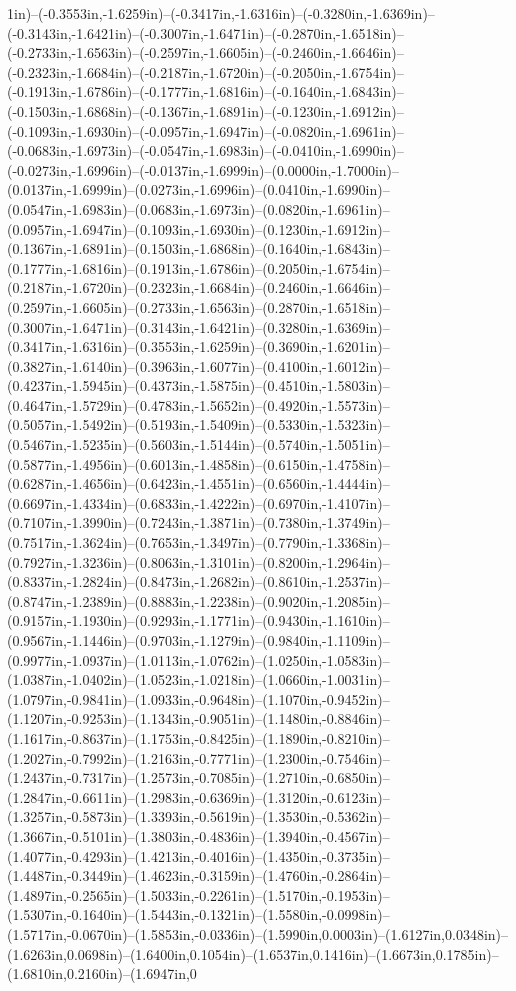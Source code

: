 1in)--(-0.3553in,-1.6259in)--(-0.3417in,-1.6316in)--(-0.3280in,-1.6369in)--(-0.3143in,-1.6421in)--(-0.3007in,-1.6471in)--(-0.2870in,-1.6518in)--(-0.2733in,-1.6563in)--(-0.2597in,-1.6605in)--(-0.2460in,-1.6646in)--(-0.2323in,-1.6684in)--(-0.2187in,-1.6720in)--(-0.2050in,-1.6754in)--(-0.1913in,-1.6786in)--(-0.1777in,-1.6816in)--(-0.1640in,-1.6843in)--(-0.1503in,-1.6868in)--(-0.1367in,-1.6891in)--(-0.1230in,-1.6912in)--(-0.1093in,-1.6930in)--(-0.0957in,-1.6947in)--(-0.0820in,-1.6961in)--(-0.0683in,-1.6973in)--(-0.0547in,-1.6983in)--(-0.0410in,-1.6990in)--(-0.0273in,-1.6996in)--(-0.0137in,-1.6999in)--(0.0000in,-1.7000in)--(0.0137in,-1.6999in)--(0.0273in,-1.6996in)--(0.0410in,-1.6990in)--(0.0547in,-1.6983in)--(0.0683in,-1.6973in)--(0.0820in,-1.6961in)--(0.0957in,-1.6947in)--(0.1093in,-1.6930in)--(0.1230in,-1.6912in)--(0.1367in,-1.6891in)--(0.1503in,-1.6868in)--(0.1640in,-1.6843in)--(0.1777in,-1.6816in)--(0.1913in,-1.6786in)--(0.2050in,-1.6754in)--(0.2187in,-1.6720in)--(0.2323in,-1.6684in)--(0.2460in,-1.6646in)--(0.2597in,-1.6605in)--(0.2733in,-1.6563in)--(0.2870in,-1.6518in)--(0.3007in,-1.6471in)--(0.3143in,-1.6421in)--(0.3280in,-1.6369in)--(0.3417in,-1.6316in)--(0.3553in,-1.6259in)--(0.3690in,-1.6201in)--(0.3827in,-1.6140in)--(0.3963in,-1.6077in)--(0.4100in,-1.6012in)--(0.4237in,-1.5945in)--(0.4373in,-1.5875in)--(0.4510in,-1.5803in)--(0.4647in,-1.5729in)--(0.4783in,-1.5652in)--(0.4920in,-1.5573in)--(0.5057in,-1.5492in)--(0.5193in,-1.5409in)--(0.5330in,-1.5323in)--(0.5467in,-1.5235in)--(0.5603in,-1.5144in)--(0.5740in,-1.5051in)--(0.5877in,-1.4956in)--(0.6013in,-1.4858in)--(0.6150in,-1.4758in)--(0.6287in,-1.4656in)--(0.6423in,-1.4551in)--(0.6560in,-1.4444in)--(0.6697in,-1.4334in)--(0.6833in,-1.4222in)--(0.6970in,-1.4107in)--(0.7107in,-1.3990in)--(0.7243in,-1.3871in)--(0.7380in,-1.3749in)--(0.7517in,-1.3624in)--(0.7653in,-1.3497in)--(0.7790in,-1.3368in)--(0.7927in,-1.3236in)--(0.8063in,-1.3101in)--(0.8200in,-1.2964in)--(0.8337in,-1.2824in)--(0.8473in,-1.2682in)--(0.8610in,-1.2537in)--(0.8747in,-1.2389in)--(0.8883in,-1.2238in)--(0.9020in,-1.2085in)--(0.9157in,-1.1930in)--(0.9293in,-1.1771in)--(0.9430in,-1.1610in)--(0.9567in,-1.1446in)--(0.9703in,-1.1279in)--(0.9840in,-1.1109in)--(0.9977in,-1.0937in)--(1.0113in,-1.0762in)--(1.0250in,-1.0583in)--(1.0387in,-1.0402in)--(1.0523in,-1.0218in)--(1.0660in,-1.0031in)--(1.0797in,-0.9841in)--(1.0933in,-0.9648in)--(1.1070in,-0.9452in)--(1.1207in,-0.9253in)--(1.1343in,-0.9051in)--(1.1480in,-0.8846in)--(1.1617in,-0.8637in)--(1.1753in,-0.8425in)--(1.1890in,-0.8210in)--(1.2027in,-0.7992in)--(1.2163in,-0.7771in)--(1.2300in,-0.7546in)--(1.2437in,-0.7317in)--(1.2573in,-0.7085in)--(1.2710in,-0.6850in)--(1.2847in,-0.6611in)--(1.2983in,-0.6369in)--(1.3120in,-0.6123in)--(1.3257in,-0.5873in)--(1.3393in,-0.5619in)--(1.3530in,-0.5362in)--(1.3667in,-0.5101in)--(1.3803in,-0.4836in)--(1.3940in,-0.4567in)--(1.4077in,-0.4293in)--(1.4213in,-0.4016in)--(1.4350in,-0.3735in)--(1.4487in,-0.3449in)--(1.4623in,-0.3159in)--(1.4760in,-0.2864in)--(1.4897in,-0.2565in)--(1.5033in,-0.2261in)--(1.5170in,-0.1953in)--(1.5307in,-0.1640in)--(1.5443in,-0.1321in)--(1.5580in,-0.0998in)--(1.5717in,-0.0670in)--(1.5853in,-0.0336in)--(1.5990in,0.0003in)--(1.6127in,0.0348in)--(1.6263in,0.0698in)--(1.6400in,0.1054in)--(1.6537in,0.1416in)--(1.6673in,0.1785in)--(1.6810in,0.2160in)--(1.6947in,0